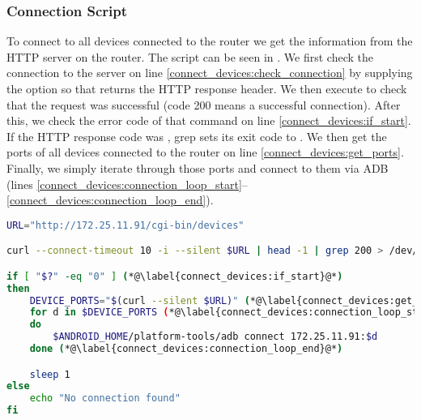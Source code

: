 \subsubsection{Connection Script}
To connect to all devices connected to the router we get the information from the HTTP server on the router. The script can be seen in . We first check the connection to the server on line \ref{connect_devices:check_connection} by supplying the  option so that  returns the HTTP response header. We then execute  to check that the request was successful (code 200 means a successful connection). After this, we check the error code of that command on line \ref{connect_devices:if_start}. If the HTTP response code was , grep sets its exit code to . We then get the ports of all devices connected to the router on line \ref{connect_devices:get_ports}. Finally, we simply iterate through those ports and connect to them via ADB (lines \ref{connect_devices:connection_loop_start}--\ref{connect_devices:connection_loop_end}).

\begin{lstlisting}[language=bash,caption=Script that connects to devices,label=lst:connect_devices]
URL="http://172.25.11.91/cgi-bin/devices"

curl --connect-timeout 10 -i --silent $URL | head -1 | grep 200 > /dev/null (*@\label{connect_devices:check_connection}@*)

if [ "$?" -eq "0" ] (*@\label{connect_devices:if_start}@*)
then
    DEVICE_PORTS="$(curl --silent $URL)" (*@\label{connect_devices:get_ports}@*)
    for d in $DEVICE_PORTS (*@\label{connect_devices:connection_loop_start}@*)
    do
        $ANDROID_HOME/platform-tools/adb connect 172.25.11.91:$d
    done (*@\label{connect_devices:connection_loop_end}@*)

    sleep 1
else
    echo "No connection found"
fi
\end{lstlisting}

